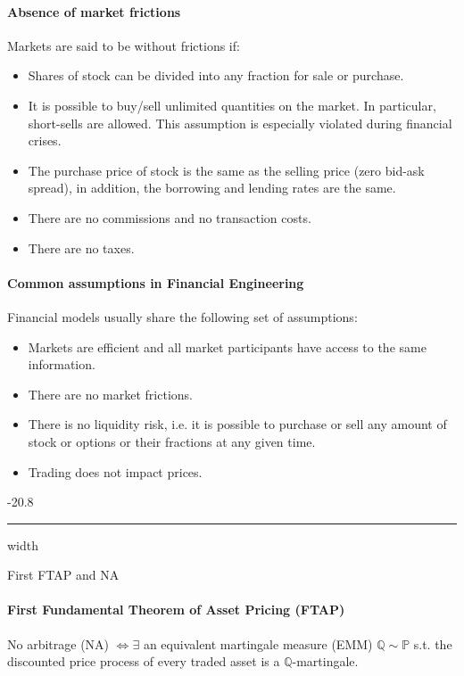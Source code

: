 \documentclass[a4paper,landscape,7pt,fleqn]{scrartcl}
\makeatletter
\renewcommand{\subsubsection}{\@startsection{subsubsection}{1}{0mm}%
{-2\baselineskip}{0.8\baselineskip}%
{\hrule depth 0.2pt width\columnwidth\vspace*{1.2em}\normalsize\bfseries}}
\makeatother
\begin{document}
\begin{multicols*}{3}
\paragraph{Absence of market frictions}
Markets are said to be without frictions if:
\begin{itemize}
\item Shares of stock can be divided into any fraction for sale or purchase.
\item It is possible to buy/sell unlimited quantities on the market. In particular, short-sells are allowed. This assumption is especially violated during financial crises.
\item The purchase price of stock is the same as the selling price (zero bid-ask spread), in addition, the borrowing and lending rates are the same.
\item There are no commissions and no transaction costs.
\item There are no taxes.
\end{itemize}

\paragraph{Common assumptions in Financial Engineering}
Financial models usually share the following set of assumptions:
\begin{itemize}
\item Markets are efficient and all market participants have access to the same information.
\item There are no market frictions.
\item There is no liquidity risk, i.e. it is possible to purchase or sell any amount of stock or options or their fractions at any given time.
\item Trading does not impact prices.
\end{itemize}

\subsubsection{First FTAP and NA}

\paragraph{First Fundamental Theorem of Asset Pricing (FTAP)}
No arbitrage (NA) $\iff \exists$ an equivalent martingale measure (EMM) $\mathbb{Q} \sim \mathbb{P}$ s.t. the discounted price process of every traded asset is a $\mathbb{Q}$-martingale.


\end{multicols*}
\end{document}
